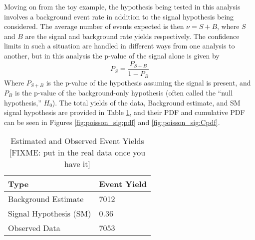     Moving on from the toy example, the hypothesis being tested in this analysis
        involves a background event rate in addition to the signal hypothesis being considered.
    The average number of events expected is then $\nu = S + B$,
        where $S$ and $B$ are the signal and background rate yields respectively.
    The confidence limits in such a situation are handled in different ways from one analysis to another,
        but in this analysis the p-value of the signal alone is given by
    \begin{equation}
        P_S = \frac{P_{S+B}}{1 - P_B}
    \end{equation}
    Where $P_{S+B}$ is the p-value of the hypothesis assuming the signal is present,
        and $P_B$ is the p-value of the background-only hypothesis
        (often called the ``null hypothesis,'' $H_0$)\cite{Barlow:2019svl}.
    The total yields of the data, Background estimate, and SM signal hypothesis are provided in Table \ref{tab:event_yield},
        and their PDF and cumulative PDF can be seen in
        Figures \ref{fig:poisson_sig:pdf} and \ref{fig:poisson_sig:Cpdf}.

    \begin{table}[tbh]
       \begin{center}
           \caption{Estimated and Observed Event Yields [FIXME: put in the real data once you have it]}
           \label{tab:event_yield}
           \footnotesize
           \begin{tabular}{|l|l|}
           \toprule
               Type  &	Event Yield \\
               \midrule
               Background Estimate  & 7012 \\
               Signal Hypothesis (SM) & 0.36 \\
               Observed Data & 7053 \\
           \bottomrule
           \end{tabular}
       \end{center}
    \end{table}

